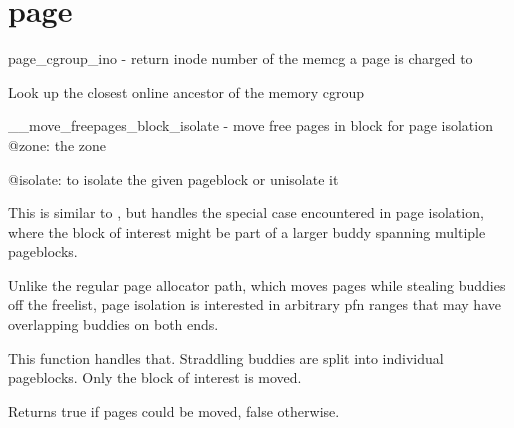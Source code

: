 \chapter{page }
\hypertarget{the}{}\label{the}
page\+\_\+cgroup\+\_\+ino -\/ return inode number of the memcg a page is charged to  

Look up the closest online ancestor of the memory cgroup

\+\_\+\+\_\+move\+\_\+freepages\+\_\+block\+\_\+isolate -\/ move free pages in block for page isolation @zone:\+ the zone  

@isolate:\+ to isolate the given pageblock or unisolate it

This is similar to , but handles the special case encountered in page isolation, where the block of interest might be part of a larger buddy spanning multiple pageblocks.

Unlike the regular page allocator path, which moves pages while stealing buddies off the freelist, page isolation is interested in arbitrary pfn ranges that may have overlapping buddies on both ends.

This function handles that. Straddling buddies are split into individual pageblocks. Only the block of interest is moved.

Returns true if pages could be moved, false otherwise. 